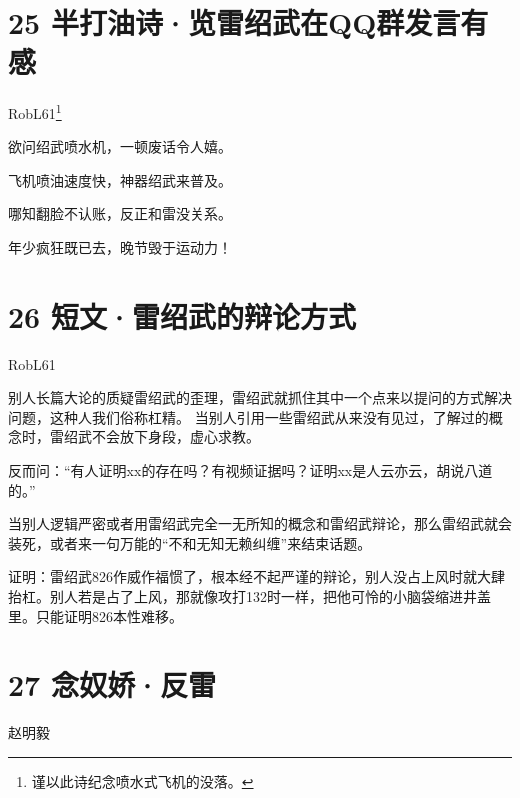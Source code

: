 \documentclass[UTF8,12pt,oneside]{ctexbook}
\begin{document}
    ~\\
        
    \section{25 半打油诗·览雷绍武在QQ群发言有感}
        \begin{center}
        RobL61\footnote{谨以此诗纪念喷水式飞机的没落。}
        \end{center}
        
        \begin{center}
        欲问绍武喷水机，一顿废话令人嬉。
        
        飞机喷油速度快，神器绍武来普及。
        
        哪知翻脸不认账，反正和雷没关系。
        
        年少疯狂既已去，晚节毁于运动力！
        ~\\
        \end{center}
        
    \newpage
        
    \section{26 短文·雷绍武的辩论方式}
        \begin{center}
            RobL61
        \end{center}
        
        别人长篇大论的质疑雷绍武的歪理，雷绍武就抓住其中一个点来以提问的方式解决问题，这种人我们俗称杠精。
        当别人引用一些雷绍武从来没有见过，了解过的概念时，雷绍武不会放下身段，虚心求教。
        
        反而问：“有人证明xx的存在吗？有视频证据吗？证明xx是人云亦云，胡说八道的。”
        
        当别人逻辑严密或者用雷绍武完全一无所知的概念和雷绍武辩论，那么雷绍武就会装死，或者来一句万能的“不和无知无赖纠缠”来结束话题。
        
        证明：雷绍武826作威作福惯了，根本经不起严谨的辩论，别人没占上风时就大肆抬杠。别人若是占了上风，那就像攻打132时一样，把他可怜的小脑袋缩进井盖里。只能证明826本性难移。
        
    \section{27 念奴娇·反雷}
        \begin{center}
            赵明毅
        \end{center}
\end{document}
